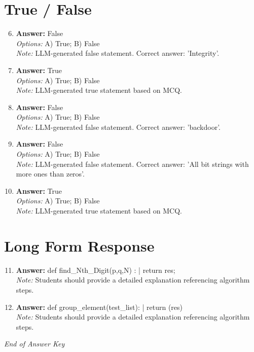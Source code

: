 \documentclass[12pt]{article}
\begin{document}
\section*{True / False}
\begin{enumerate}[label=\arabic*.]
\setcounter{enumi}{5}
\item \textbf{Answer:} False
\\ \textit{Options:} A) True; B) False
\\ \textit{Note:} LLM-generated false statement. Correct answer: 'Integrity'.
\item \textbf{Answer:} True
\\ \textit{Options:} A) True; B) False
\\ \textit{Note:} LLM-generated true statement based on MCQ.
\item \textbf{Answer:} False
\\ \textit{Options:} A) True; B) False
\\ \textit{Note:} LLM-generated false statement. Correct answer: 'backdoor'.
\item \textbf{Answer:} False
\\ \textit{Options:} A) True; B) False
\\ \textit{Note:} LLM-generated false statement. Correct answer: 'All bit strings with more ones than zeros'.
\item \textbf{Answer:} True
\\ \textit{Options:} A) True; B) False
\\ \textit{Note:} LLM-generated true statement based on MCQ.
\end{enumerate}

\section*{Long Form Response}
\begin{enumerate}[label=\arabic*.]
\setcounter{enumi}{10}
\item \textbf{Answer:} def find\_Nth\_Digit(p,q,N) : | return res;
\\ \textit{Note:} Students should provide a detailed explanation referencing algorithm steps.
\item \textbf{Answer:} def group\_element(test\_list): | return (res)
\\ \textit{Note:} Students should provide a detailed explanation referencing algorithm steps.
\end{enumerate}

\vfill
\noindent\textit{End of Answer Key}
\end{document}
